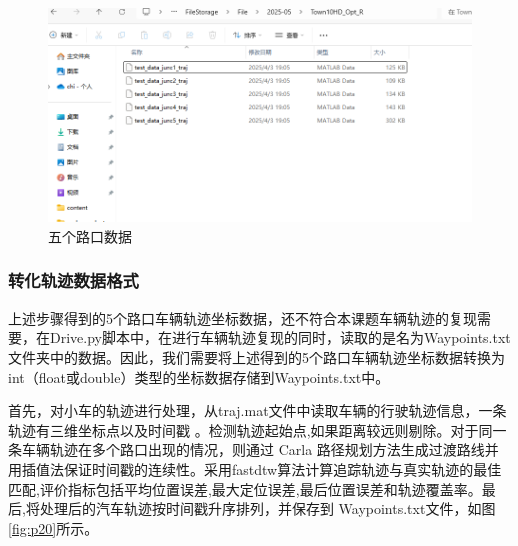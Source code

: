 \begin{figure}[htbp] %
	\centering
	\includegraphics[width=1\textwidth]{p19} %
	\caption{五个路口数据} %
	\label{fig:p19} %
\end{figure}






\subsubsection{转化轨迹数据格式}
上述步骤得到的5个路口车辆轨迹坐标数据，还不符合本课题车辆轨迹的复现需要，在Drive.py脚本中，在进行车辆轨迹复现的同时，读取的是名为Waypoints.txt文件夹中的数据。因此，我们需要将上述得到的5个路口车辆轨迹坐标数据转换为int（float或double）类型的坐标数据存储到Waypoints.txt中。

首先，对小车的轨迹进行处理，从traj.mat文件中读取车辆的行驶轨迹信息，一条轨迹有三维坐标点以及时间戳 。检测轨迹起始点,如果距离较远则剔除。对于同一条车辆轨迹在多个路口出现的情况，则通过 Carla 路径规划方法生成过渡路线并用插值法保证时间戳的连续性。采用fastdtw算法计算追踪轨迹与真实轨迹的最佳匹配,评价指标包括平均位置误差,最大定位误差,最后位置误差和轨迹覆盖率。最后,将处理后的汽车轨迹按时间戳升序排列，并保存到 Waypoints.txt文件，如图\ref{fig:p20}所示。


